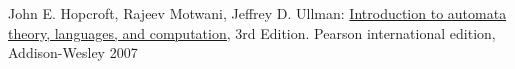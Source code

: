 \documentclass{article}
\theoremstyle{theorem}
\theoremstyle{definition}
\theoremstyle{remark}
\begin{document}
\begin{thebibliography}{99}
	John E. Hopcroft, Rajeev Motwani, Jeffrey D. Ullman:
\href{http://ce.sharif.edu/courses/94-95/1/ce414-2/resources/root/Text%20Books/Automata/John%20E.%20Hopcroft,%20Rajeev%20Motwani,%20Jeffrey%20D.%20Ullman-Introduction%20to%20Automata%20Theory,%20Languages,%20and%20Computations-Prentice%20Hall%20(2006).pdf}{Introduction to automata theory, languages, and computation,} 3rd Edition. Pearson international edition, Addison-Wesley 2007

\end{thebibliography}
\end{document}
